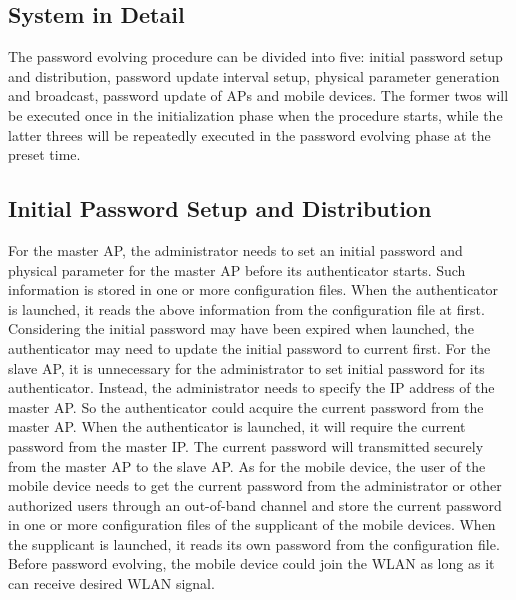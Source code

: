 \subsection{System in Detail}
The password evolving procedure can be divided into five: initial password setup and distribution, password update interval setup, physical parameter generation and broadcast, password update of APs and mobile devices. The former twos will be executed once in the initialization phase when the procedure starts, while the latter threes will be repeatedly executed in the password evolving phase at the preset time. 

\subsection{Initial Password Setup and Distribution}
For the master AP, the administrator needs to set an initial password and physical parameter for the master AP before its authenticator starts. Such information is stored in one or more configuration files. When the authenticator is launched, it reads the above information from the configuration file at first. Considering the initial password may have been expired when launched, the authenticator may need to update the initial password to current first. For the slave AP, it is unnecessary for the administrator to set initial password for its authenticator. Instead, the administrator needs to specify the IP address of the master AP. So the authenticator could acquire the current password from the master AP. When the authenticator is launched, it will require the current password from the master IP. The current password will transmitted securely from the master AP to the slave AP. As for the mobile device, the user of the mobile device needs to get the current password from the administrator or other authorized users through an out-of-band channel and store the current password in one or more configuration files of the supplicant of the mobile devices. When the supplicant is launched, it reads its own password from the configuration file. Before password evolving, the mobile device could join the WLAN as long as it can receive desired WLAN signal. 

